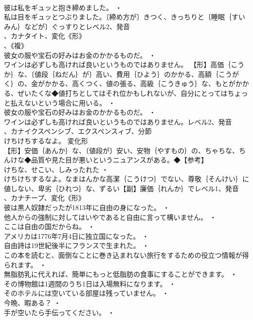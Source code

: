 \documentclass[8pt]{extreport}
\begin{document}
\begin{CJK}{UTF8}{min}
\\	彼は私をギュッと抱き締めました。 ・
\\	私は目をギュッとつぶりました。〔締め方が〕きつく、きっちりと〔睡眠｛すいみん｝などが〕ぐっすりとレベル2、発音
\\	、カナタイト、変化《形》
\\	、《複》
\\	彼女の服や宝石の好みはお金のかかるものだ。 ・
\\	ワインは必ずしも高ければ良いというものではありません。		【形】高価｛こうか｝な、〔値段｛ねだん｝が〕高い、費用｛ひよう｝のかかる、高額｛こうがく｝の、金がかかる、高くつく、値の張る、高級｛こうきゅう｝な、もとがかかる、ぜいたくな◆値打ちとしてはそれ位かもしれないが、自分にとってはちょっと払えないという場合に用いる。 ・
\\	彼女の服や宝石の好みはお金のかかるものだ。 ・
\\	ワインは必ずしも高ければ良いというものではありません。レベル2、発音
\\	、カナイクスペンシブ、エクスペンスィブ、分節
\\	けちけちするなよ。	変化形 
\\	【形】安価｛あんか｝な、〔値段が〕安い、安物｛やすもの｝の、ちゃちな、ちんけな◆品質や見た目が悪いというニュアンスがある。◆【参考】
\\	けちな、せこい、しみったれた ・
\\	けちけちするなよ。なまはんかな高潔｛こうけつ｝でない、尊敬｛そんけい｝に値しない、卑劣｛ひれつ｝な、ずるい【副】廉価｛れんか｝でレベル1、発音
\\	、カナチープ、変化《形》
\\	彼は黒人奴隷だったが1813年に自由の身になった。 ・
\\	他人からの強制に対してはいやであると自由に言って構いません。 ・
\\	ここは自由の国だからね。 ・
\\	アメリカは1776年7月4日に独立国になった。 ・
\\	自由詩は19世紀後半にフランスで生まれた。 ・
\\	この本を読むと、面倒なことに巻き込まれない旅行をするための役立つ情報が得られます。 ・
\\	無脂肪乳に代えれば、簡単にもっと低脂肪の食事にすることができます。 ・
\\	その博物館は1週間のうち1日は入場無料になります。 ・
\\	そのホテルには空いている部屋は残っていません。 ・
\\	今晩、暇ある？ ・
\\	手が空いたら手伝ってください。 ・

\end{CJK}
\end{document}
